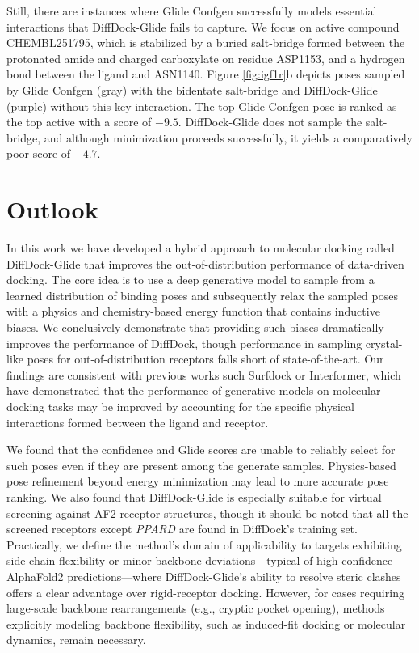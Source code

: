 \documentclass[letterpaper]{article}
\begin{document}
Still, there are instances where Glide Confgen successfully models essential interactions that DiffDock-Glide fails to capture. We focus on active compound CHEMBL251795, which is stabilized by a buried salt-bridge formed between the protonated amide and charged carboxylate on residue ASP1153, and a hydrogen bond between the ligand and ASN1140. Figure \ref{fig:igf1r}b depicts poses sampled by Glide Confgen (gray) with the bidentate salt-bridge and DiffDock-Glide (purple) without this key interaction. The top Glide Confgen pose is ranked as the top active with a score of $-9.5$. DiffDock-Glide does not sample the salt-bridge, and although minimization proceeds successfully, it yields a comparatively poor score of $-4.7$.

\section{Outlook}
In this work we have developed a hybrid approach to molecular docking called DiffDock-Glide that improves the out-of-distribution performance of data-driven docking. The core idea is to use a deep generative model to sample from a learned distribution of binding poses and subsequently relax the sampled poses with a physics and chemistry-based energy function that contains inductive biases. We conclusively demonstrate that providing such biases dramatically improves the performance of DiffDock, though performance in sampling crystal-like poses for out-of-distribution receptors falls short of state-of-the-art. Our findings are consistent with previous works such Surfdock or Interformer, which have demonstrated that the performance of generative models on molecular docking tasks may be improved by accounting for the specific physical interactions formed between the ligand and receptor.\cite{lai2024interformer,cao2025surfdock}

We found that the confidence and Glide scores are unable to reliably select for such poses even if they are present among the generate samples. Physics-based pose refinement beyond energy minimization may lead to more accurate pose ranking. We also found that DiffDock-Glide is especially suitable for virtual screening against AF2 receptor structures, though it should be noted that all the screened receptors except {\it PPARD} are found in DiffDock's training set. Practically, we define the method's domain of applicability to targets exhibiting side-chain flexibility or minor backbone deviations—typical of high-confidence AlphaFold2 predictions—where DiffDock-Glide’s ability to resolve steric clashes offers a clear advantage over rigid-receptor docking. However, for cases requiring large-scale backbone rearrangements (e.g., cryptic pocket opening), methods explicitly modeling backbone flexibility, such as induced-fit docking or molecular dynamics, remain necessary.
\end{document}
